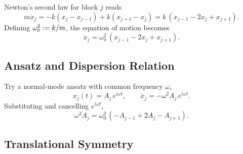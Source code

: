 Newton's second law for block $j$ reads
\begin{equation}
    m\ddot{x}_j = -k(x_j - x_{j-1}) + k(x_{j+1} - x_j) = k\,(x_{j-1} - 2 x_j + x_{j+1}).
\end{equation}
Defining $\omega_0^2 \vcentcolon= k/m$, the equation of motion becomes
\begin{equation}
    \ddot{x}_j = \omega_0^2 \,(x_{j-1} - 2 x_j + x_{j+1}).
\end{equation}

\subsection{Ansatz and Dispersion Relation}

Try a normal-mode ansatz with common frequency $\omega$,
\begin{equation}
    x_j(t) = A_j\, e^{i\omega t}, \qquad \ddot{x}_j = -\omega^2 A_j\, e^{i\omega t}.
\end{equation}
Substituting and cancelling $e^{i\omega t}$,
\begin{equation}
    \omega^2 A_j = \omega_0^2\,(-A_{j-1} + 2 A_j - A_{j+1}).
\end{equation}

\subsection{Translational Symmetry}

